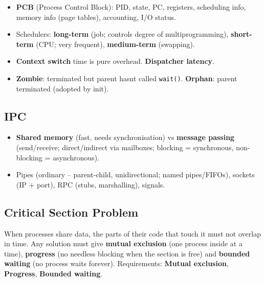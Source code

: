 

\begin{itemize}
\tightlist
\item
  \textbf{PCB} (Process Control Block): PID, state, PC, registers, scheduling info, memory info (page tables), accounting, I/O status.
\item
  Schedulers: \textbf{long-term} (job; controls degree of multiprogramming), \textbf{short-term} (CPU; very frequent), \textbf{medium-term} (swapping).
\item
  \textbf{Context switch} time is pure overhead. \textbf{Dispatcher latency}.
\item
  \textbf{Zombie}: terminated but parent hasn\textquotesingle t called \texttt{wait()}. \textbf{Orphan}: parent terminated (adopted by init).
\end{itemize}

\needspace{95pt}

\hypertarget{p2-05--32-ipc}{%
\subsection{IPC}\label{p2-05--32-ipc}}

\begin{itemize}
\tightlist
\item
  \textbf{Shared memory} (fast, needs synchronisation) vs \textbf{message passing} (send/receive; direct/indirect via mailboxes; blocking = synchronous, non-blocking = asynchronous).
\item
  Pipes (ordinary -- parent-child, unidirectional; named pipes/FIFOs), sockets (IP + port), RPC (stubs, marshalling), signals.
\end{itemize}

\needspace{229pt}

\hypertarget{p2-05--33-critical-section-problem}{%
\subsection{Critical Section Problem}\label{p2-05--33-critical-section-problem}}

When processes share data, the parts of their code that touch it must not overlap in time. Any solution must
give \textbf{mutual exclusion} (one process inside at a time), \textbf{progress} (no needless blocking when the
section is free) and \textbf{bounded waiting} (no process waits forever).
Requirements: \textbf{Mutual exclusion}, \textbf{Progress}, \textbf{Bounded waiting}.

